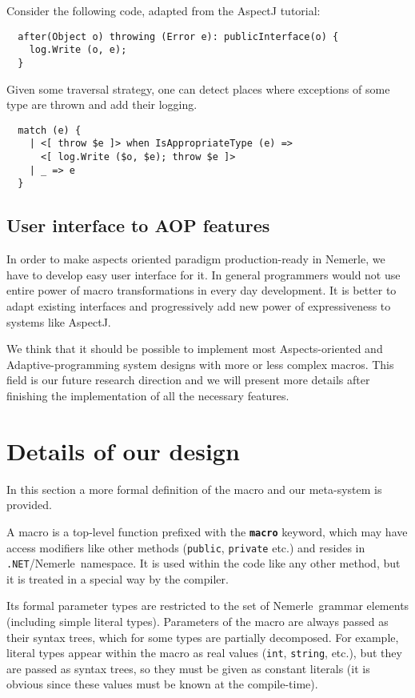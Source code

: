 \documentclass{llncs}
\newcommand{\net}[0]{{\tt .NET}}
\newcommand{\nem}[0]{Nemerle}
\newcommand{\kw}[1]{{\tt \bf #1}}
\begin{document}
Consider the following code, adapted from the AspectJ tutorial: 

\begin{verbatim}
  after(Object o) throwing (Error e): publicInterface(o) {
    log.Write (o, e);
  }
\end{verbatim}

Given some traversal strategy, one can detect places where exceptions of some
type are thrown and add their logging.

\begin{verbatim}
  match (e) {
    | <[ throw $e ]> when IsAppropriateType (e) =>
      <[ log.Write ($o, $e); throw $e ]>
    | _ => e
  }
\end{verbatim}

\subsection{User interface to AOP features}
In order to make aspects oriented paradigm production-ready in Nemerle, we have
to develop easy user interface for it. In general programmers would not use entire power
of macro transformations in every day development. It is better to adapt existing
interfaces and progressively add new power of expressiveness to systems like AspectJ.

We think that it should be possible to implement most Aspects-oriented
and Adaptive-programming system designs with more or less complex 
macros. This field is our future research direction and we will present
more details after finishing the implementation of all the necessary features.

\section{Details of our design}
In this section a more formal definition of the macro and our meta-system is provided.

A macro is a top-level function prefixed with the \kw{macro} keyword, 
which may have access modifiers like other methods (\verb,public,, \verb,private, etc.) 
and resides in \net/\nem\ namespace. It is used within the code like
any other method, but it is treated in a special way by the compiler.

Its formal parameter types are restricted to the set of \nem\
grammar elements (including simple literal types). Parameters of 
the macro are always passed as their syntax trees, which for some
types are partially decomposed. For example, literal types appear
within the macro as real values (\verb,int,, \verb,string,, etc.),
but they are passed
as syntax trees, so they must be given as constant literals (it is
obvious since these values must be known at the compile-time).
\end{document}
